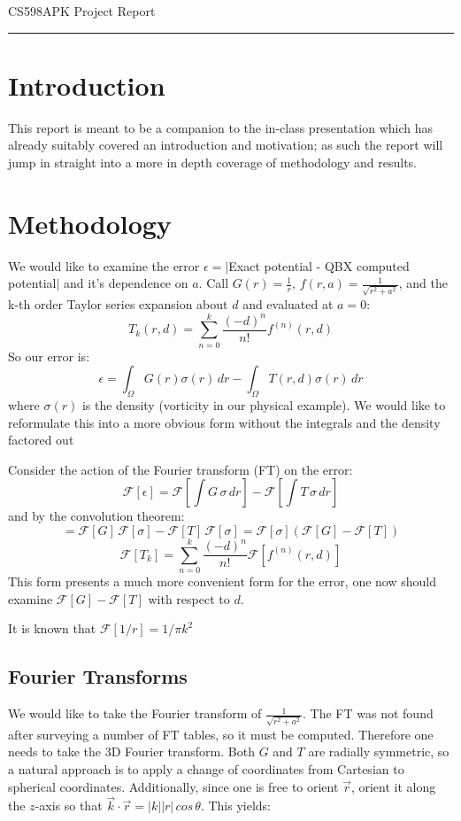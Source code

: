 \documentclass[letterpaper,10pt]{article}
\begin{document}
\begin{flushright}
{\Large CS598APK Project Report}
\end{flushright}
\vskip -0.1in
\hrule
\vskip 0.4in

\section*{Introduction}
This report is meant to be a companion to the in-class presentation which has already suitably covered an introduction and motivation; as such the report will jump in straight into a more in depth coverage of methodology and results. \vskip 0.1in

\section*{Methodology}
We would like to examine the error $\epsilon = |$Exact potential - QBX computed potential$|$ and it's dependence on $a$. Call $G(r) = \frac{1}{r}$, $f(r,a) = \frac{1}{\sqrt{r^2+a^2}}$, and the k-th order Taylor series expansion about $d$ and evaluated at $a=0$: 
$$T_k(r,d) = \sum^k_{n=0}\frac{(-d)^n}{n!}f^{(n)}(r,d)$$
So our error is: $$\epsilon = \int_\Omega G(r) \sigma(r) \, dr - \int_\Omega T(r,d) \sigma(r) \, dr$$ where $\sigma(r)$ is the density (vorticity in our physical example). We would like to reformulate this into a more obvious form without the integrals and the density factored out

Consider the action of the Fourier transform (FT) on the error:
$$\mathcal{F}[\epsilon] = \mathcal{F}\left[ \int G \, \sigma \, dr \right] - \mathcal{F}\left[ \int T \, \sigma \, dr \right]$$
and by the convolution theorem:
$$= \mathcal{F}[G] \, \mathcal{F}[\sigma] - \mathcal{F}[T]\,\mathcal{F}[\sigma] = \mathcal{F}[\sigma] \left(\mathcal{F}[G] - \mathcal{F}[T]\right)  $$
$$\mathcal{F}[T_k] = \sum_{n=0}^k \frac{(-d)^n}{n!} \mathcal{F}[f^{(n)}(r,d)]$$
This form presents a much more convenient form for the error, one now should examine $\mathcal{F}[G] - \mathcal{F}[T]$ with respect to $d$.

It is known that $\mathcal{F}[1/r] = 1/\pi k^2$
\subsection*{Fourier Transforms}
We would like to take the Fourier transform of $\frac{1}{\sqrt{r^2+a^2}}$. The FT was not found after surveying a number of FT tables, so it must be computed. Therefore one needs to take the 3D Fourier transform. Both $G$ and $T$ are radially symmetric, so a natural approach is to apply a change of coordinates from Cartesian to spherical coordinates. Additionally, since one is free to orient $\vec r$, orient it along the $z$-axis so that $\vec k \cdot \vec r = |k||r| \, cos\,\theta$. This yields:
\end{document}
